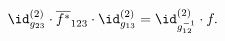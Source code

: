 \begin{equation}
  \id^{(2)}_{g_{23}}\cdot\overline{f^\ast}_{123}\cdot\id^{(2)}_{g_{13}}
  = \id^{(2)}_{g_{12}^{-1}}\cdot f.
\end{equation}

